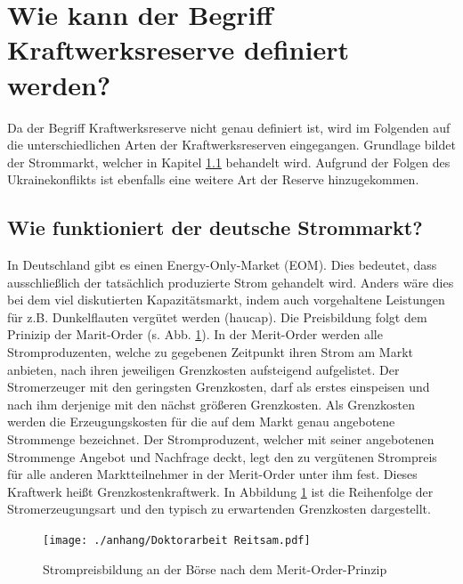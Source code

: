 \section{Wie kann der Begriff Kraftwerksreserve definiert werden?}

	Da der Begriff Kraftwerksreserve nicht genau definiert ist, wird im Folgenden auf die unterschiedlichen Arten der Kraftwerksreserven eingegangen.
	Grundlage bildet der Strommarkt, welcher in Kapitel \ref{sect: Wie funktioniert der deutsche Strommarkt?} behandelt wird.
	Aufgrund der Folgen des Ukrainekonflikts ist ebenfalls eine weitere Art der Reserve hinzugekommen.

	\subsection{Wie funktioniert der deutsche Strommarkt?} \label{sect: Wie funktioniert der deutsche Strommarkt?}
	
		In Deutschland gibt es einen Energy-Only-Market (EOM).
		Dies bedeutet, dass ausschließlich der tatsächlich produzierte Strom gehandelt wird.
		Anders wäre dies bei dem viel diskutierten Kapazitätsmarkt, indem auch vorgehaltene Leistungen für z.B. Dunkelflauten vergütet werden (haucap).
		Die Preisbildung folgt dem Prinizip der Marit-Order (s. Abb. \ref{Abb. Strompreisbildung Merit Order}).
		In der Merit-Order werden alle Stromproduzenten, welche zu gegebenen Zeitpunkt ihren Strom am Markt anbieten, nach ihren jeweiligen Grenzkosten aufsteigend aufgelistet.
		Der Stromerzeuger mit den geringsten Grenzkosten, darf als erstes einspeisen und nach ihm derjenige mit den nächst größeren Grenzkosten.
		Als Grenzkosten werden die Erzeugungskosten für die auf dem Markt genau angebotene Strommenge bezeichnet.
		Der Stromproduzent, welcher mit seiner angebotenen Strommenge Angebot und Nachfrage deckt, legt den zu vergütenen Strompreis für alle anderen Marktteilnehmer in der Merit-Order unter ihm fest.
		Dieses Kraftwerk heißt Grenzkostenkraftwerk.
		In Abbildung \ref{Abb. Strompreisbildung Merit Order} ist die Reihenfolge der Stromerzeugungsart und den typisch zu erwartenden Grenzkosten dargestellt. \\
		
		\begin{figure} [H]
			\centering
			\label{Abb. Strompreisbildung Merit Order}
			\texttt{[image: ./anhang/Doktorarbeit Reitsam.pdf]}
			\caption{Strompreisbildung an der Börse nach dem Merit-Order-Prinzip \parencite{Doktorarbeit_Reitsam}}
		\end{figure}
		
